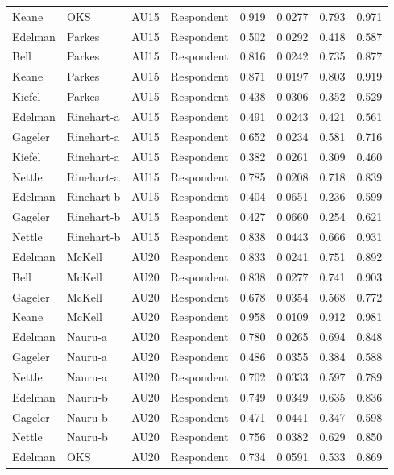 \documentclass{monashthesis}
\begin{document}
\begin{center}
\begin{longtable}{llllllll}
Keane & OKS & AU15 & Respondent & 0.919 & 0.0277 & 0.793 & 0.971 \\
Edelman & Parkes & AU15 & Respondent & 0.502 & 0.0292 & 0.418 & 0.587 \\
Bell & Parkes & AU15 & Respondent & 0.816 & 0.0242 & 0.735 & 0.877 \\
Keane & Parkes & AU15 & Respondent & 0.871 & 0.0197 & 0.803 & 0.919 \\
Kiefel & Parkes & AU15 & Respondent & 0.438 & 0.0306 & 0.352 & 0.529 \\
Edelman & Rinehart-a & AU15 & Respondent & 0.491 & 0.0243 & 0.421 & 0.561 \\
Gageler & Rinehart-a & AU15 & Respondent & 0.652 & 0.0234 & 0.581 & 0.716 \\
Kiefel & Rinehart-a & AU15 & Respondent & 0.382 & 0.0261 & 0.309 & 0.460 \\
Nettle & Rinehart-a & AU15 & Respondent & 0.785 & 0.0208 & 0.718 & 0.839 \\
Edelman & Rinehart-b & AU15 & Respondent & 0.404 & 0.0651 & 0.236 & 0.599 \\
Gageler & Rinehart-b & AU15 & Respondent & 0.427 & 0.0660 & 0.254 & 0.621 \\
Nettle & Rinehart-b & AU15 & Respondent & 0.838 & 0.0443 & 0.666 & 0.931 \\
Edelman & McKell & AU20 & Respondent & 0.833 & 0.0241 & 0.751 & 0.892 \\
Bell & McKell & AU20 & Respondent & 0.838 & 0.0277 & 0.741 & 0.903 \\
Gageler & McKell & AU20 & Respondent & 0.678 & 0.0354 & 0.568 & 0.772 \\
Keane & McKell & AU20 & Respondent & 0.958 & 0.0109 & 0.912 & 0.981 \\
Edelman & Nauru-a & AU20 & Respondent & 0.780 & 0.0265 & 0.694 & 0.848 \\
Gageler & Nauru-a & AU20 & Respondent & 0.486 & 0.0355 & 0.384 & 0.588 \\
Nettle & Nauru-a & AU20 & Respondent & 0.702 & 0.0333 & 0.597 & 0.789 \\
Edelman & Nauru-b & AU20 & Respondent & 0.749 & 0.0349 & 0.635 & 0.836 \\
Gageler & Nauru-b & AU20 & Respondent & 0.471 & 0.0441 & 0.347 & 0.598 \\
Nettle & Nauru-b & AU20 & Respondent & 0.756 & 0.0382 & 0.629 & 0.850 \\
Edelman & OKS & AU20 & Respondent & 0.734 & 0.0591 & 0.533 & 0.869 \\

\end{longtable}
\end{center}
\end{document}
